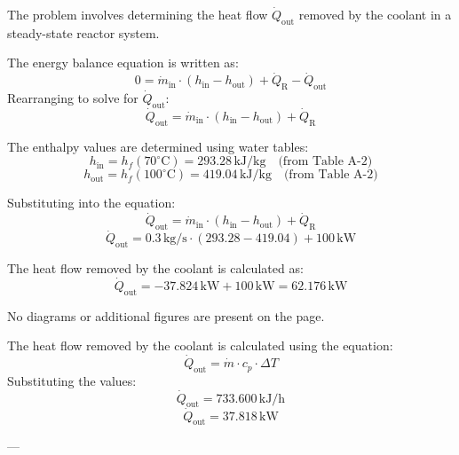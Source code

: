 The problem involves determining the heat flow \( \dot{Q}_{\text{out}} \) removed by the coolant in a steady-state reactor system.  

The energy balance equation is written as:  
\[
0 = \dot{m}_{\text{in}} \cdot (h_{\text{in}} - h_{\text{out}}) + \dot{Q}_{\text{R}} - \dot{Q}_{\text{out}}
\]  
Rearranging to solve for \( \dot{Q}_{\text{out}} \):  
\[
\dot{Q}_{\text{out}} = \dot{m}_{\text{in}} \cdot (h_{\text{in}} - h_{\text{out}}) + \dot{Q}_{\text{R}}
\]  

The enthalpy values are determined using water tables:  
\[
h_{\text{in}} = h_f(70^\circ\text{C}) = 293.28 \, \text{kJ/kg} \quad \text{(from Table A-2)}
\]  
\[
h_{\text{out}} = h_f(100^\circ\text{C}) = 419.04 \, \text{kJ/kg} \quad \text{(from Table A-2)}
\]  

Substituting into the equation:  
\[
\dot{Q}_{\text{out}} = \dot{m}_{\text{in}} \cdot (h_{\text{in}} - h_{\text{out}}) + \dot{Q}_{\text{R}}
\]  
\[
\dot{Q}_{\text{out}} = 0.3 \, \text{kg/s} \cdot (293.28 - 419.04) + 100 \, \text{kW}
\]  

The heat flow removed by the coolant is calculated as:  
\[
\dot{Q}_{\text{out}} = -37.824 \, \text{kW} + 100 \, \text{kW} = 62.176 \, \text{kW}
\]  

No diagrams or additional figures are present on the page.

The heat flow removed by the coolant is calculated using the equation:  
\[
\dot{Q}_{\text{out}} = \dot{m} \cdot c_p \cdot \Delta T
\]  
Substituting the values:  
\[
\dot{Q}_{\text{out}} = 733.600 \, \text{kJ/h}
\]  
\[
\dot{Q}_{\text{out}} = 37.818 \, \text{kW}
\]  

---